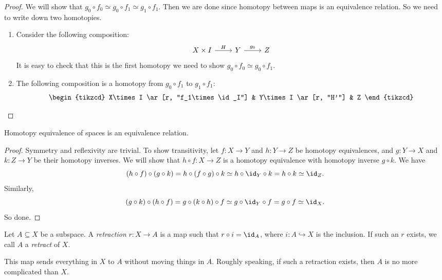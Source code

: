 \documentclass[a4paper]{article}
\begin{document}
\begin{proof}
  We will show that $g_0 \circ f_0 \simeq g_0 \circ f_1 \simeq g_1 \circ f_1$. Then we are done since homotopy between maps is an equivalence relation. So we need to write down two homotopies.

  \begin{enumerate}
    \item Consider the following composition:
      \[
        \begin{tikzcd}
          X\times I \ar[r, "H"] & Y \ar[r, "g_0"] & Z
        \end{tikzcd}
      \]
      It is easy to check that this is the first homotopy we need to show $g_0\circ f_0 \simeq g_0 \circ f_1$.
    \item The following composition is a homotopy from $g_0 \circ f_1$ to $g_1 \circ f_1$:
      \[
        \begin{tikzcd}
          X\times I \ar[r, "f_1\times \id_I"] & Y\times I \ar[r, "H'"] & Z
        \end{tikzcd}\qedhere
      \]%
  \end{enumerate}
\end{proof}

\begin{prop}
  Homotopy equivalence of spaces is an equivalence relation.
\end{prop}

\begin{proof}
  Symmetry and reflexivity are trivial. To show transitivity, let $f: X \to Y$ and $h: Y \to Z$ be homotopy equivalences, and $g: Y \to X$ and $k: Z \to Y$ be their homotopy inverses. We will show that $h \circ f: X \to Z$ is a homotopy equivalence with homotopy inverse $g \circ k$. We have
  \[
    (h \circ f) \circ (g \circ k) = h \circ (f \circ g) \circ k \simeq h \circ {\id_Y} \circ k = h \circ k \simeq \id_Z.
  \]
  Similarly,
  \[
    (g \circ k) \circ (h \circ f) = g \circ (k \circ h) \circ f \simeq g \circ {\id_Y} \circ f = g \circ f \simeq \id_X.
  \]
  So done.
\end{proof}

\begin{defi}[Retraction]
  Let $A\subseteq X$ be a subspace. A \emph{retraction} $r: X\to A$ is a map such that $r\circ i = \id_A$, where $i: A\hookrightarrow X$ is the inclusion. If such an $r$ exists, we call $A$ a \emph{retract} of $X$.
\end{defi}
This map sends everything in $X$ to $A$ without moving things in $A$. Roughly speaking, if such a retraction exists, then $A$ is no more complicated than $X$.
\end{document}
